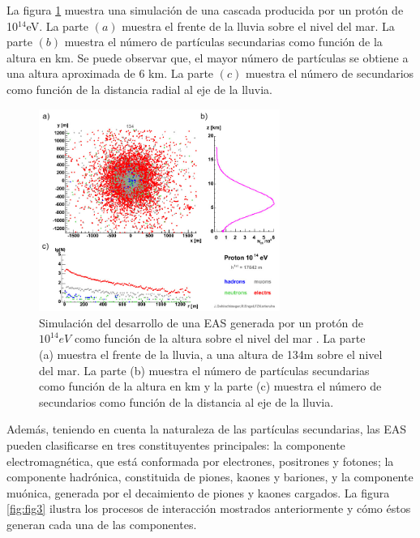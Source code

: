 La figura \ref{fig:fig2} muestra una simulación de una cascada producida por un protón de 10$^{14}$eV. La parte $(a)$ muestra el frente de la lluvia sobre el nivel del mar. La parte $(b)$ muestra el número de partículas secundarias como función de la altura en km. Se puede observar que, el mayor número de partículas se obtiene a una altura aproximada de 6 km. La parte $(c)$ muestra el número de secundarios como función de la distancia radial al eje de la lluvia.\\

\begin{figure}[htb!]
     \begin{center}
        \includegraphics[width=0.7\textwidth]{Figs/frame_176_delay.png}
        \end{center}
    \caption[Simulación del desarrollo de una EAS generada por un protón de $10^{14} eV$.]{Simulación del desarrollo de una EAS generada por un protón de $10^{14} eV$ como función de la altura sobre el nivel del mar \parencite{kit}. La parte (a) muestra el frente de la lluvia, a una altura de 134m sobre el nivel del mar. La parte (b) muestra el número de partículas secundarias como función de la altura en km y la parte (c) muestra el número de secundarios como función de la distancia al eje de la lluvia.}
    \label{fig:fig2}
\end{figure}
Además, teniendo en cuenta la naturaleza de las partículas secundarias, las EAS pueden clasificarse en tres constituyentes principales: la componente electromagnética, que está conformada por electrones, positrones y fotones; la componente hadrónica, constituida de piones, kaones y bariones, y la componente muónica, generada por el decaimiento de piones y kaones cargados. La figura \ref{fig:fig3} ilustra los procesos de interacción mostrados anteriormente y cómo éstos generan cada una de las componentes.
